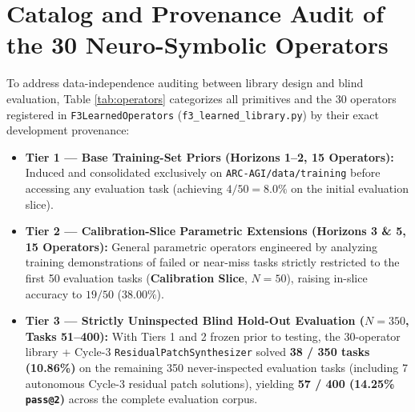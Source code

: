 \documentclass[10pt,a4paper]{article}
\begin{document}
\section{Catalog and Provenance Audit of the 30 Neuro-Symbolic Operators}
\label{app:operators}

To address data-independence auditing between library design and blind evaluation, Table \ref{tab:operators} categorizes all primitives and the 30 operators registered in \texttt{F3LearnedOperators} (\texttt{f3\_learned\_library.py}) by their exact development provenance:
\begin{itemize}
    \item \textbf{Tier 1 --- Base Training-Set Priors (Horizons 1--2, 15 Operators):} Induced and consolidated exclusively on \texttt{ARC-AGI/data/training} before accessing any evaluation task (achieving $4/50 = 8.0\%$ on the initial evaluation slice).
    \item \textbf{Tier 2 --- Calibration-Slice Parametric Extensions (Horizons 3 \& 5, 15 Operators):} General parametric operators engineered by analyzing training demonstrations of failed or near-miss tasks strictly restricted to the first 50 evaluation tasks (\textbf{Calibration Slice}, $N=50$), raising in-slice accuracy to $19/50$ ($38.00\%$).
    \item \textbf{Tier 3 --- Strictly Uninspected Blind Hold-Out Evaluation ($N=350$, Tasks 51--400):} With Tiers 1 and 2 frozen prior to testing, the 30-operator library + Cycle-3 \texttt{ResidualPatchSynthesizer} solved \textbf{38 / 350 tasks (10.86\%)} on the remaining 350 never-inspected evaluation tasks (including 7 autonomous Cycle-3 residual patch solutions), yielding \textbf{57 / 400 (14.25\% \texttt{pass@2})} across the complete evaluation corpus.
\end{itemize}
\end{document}
